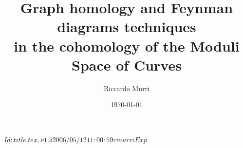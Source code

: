 \RCSID $Id: title.tex,v 1.5 2006/05/12 11:00:59 rmurri Exp $


\title{%
  Graph homology and Feynman diagrams techniques \\
  in the cohomology of the Moduli Space of Curves
}
\date{\today}
\author{Riccardo Murri}
\address{%
  The Abdus Salam I.C.T.P. \\
  strada Costiera, 11 \\
  34014 Trieste \\
  Italy
}

\maketitle

\setcounter{tocdepth}{2} %

\tableofcontents

